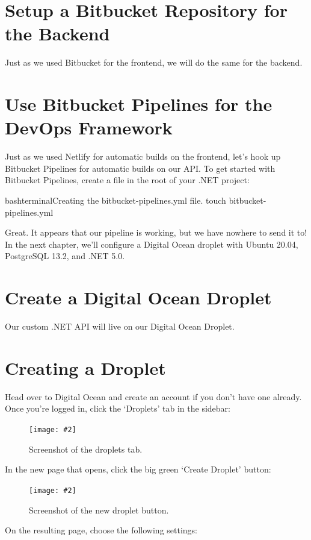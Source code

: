 \documentclass[paper=6in:9in,pagesize=pdftex,headinclude=on,footinclude=on,12pt]{scrbook}
\newcommand{\standardfigure}[3]{\begin{figure}[H]\begin{center}\texttt{[image: \#2]}\caption{#3}\label{fig:#2}\end{center}\end{figure}}
\begin{document}
\section{Setup a Bitbucket Repository for the Backend}

Just as we used Bitbucket for the frontend, we will do the same for the backend.

\section{Use Bitbucket Pipelines for the DevOps Framework}

Just as we used Netlify for automatic builds on the frontend, let's hook up Bitbucket Pipelines for automatic builds on our API. To get started with Bitbucket Pipelines, create a  file in the root of your .NET project:

\begin{codeInput}{bash}{terminal}{Creating the bitbucket-pipelines.yml file.}
touch bitbucket-pipelines.yml  
\end{codeInput}

Great. It appears that our pipeline is working, but we have nowhere to send it to! In the next chapter, we'll configure a Digital Ocean droplet with Ubuntu 20.04, PostgreSQL 13.2, and .NET 5.0.

\section{Create a Digital Ocean Droplet}

Our custom .NET API will live on our Digital Ocean Droplet.

\section{Creating a Droplet}

Head over to Digital Ocean and create an account if you don't have one already. Once you're logged in, click the `Droplets' tab in the sidebar:

\standardfigure{\textwidth/2}{droplet/droplets-tab}{Screenshot of the droplets tab.}

In the new page that opens, click the big green `Create Droplet' button:

\standardfigure{\textwidth}{droplet/new-droplet}{Screenshot of the new droplet button.}

On the resulting page, choose the following settings:
\end{document}

